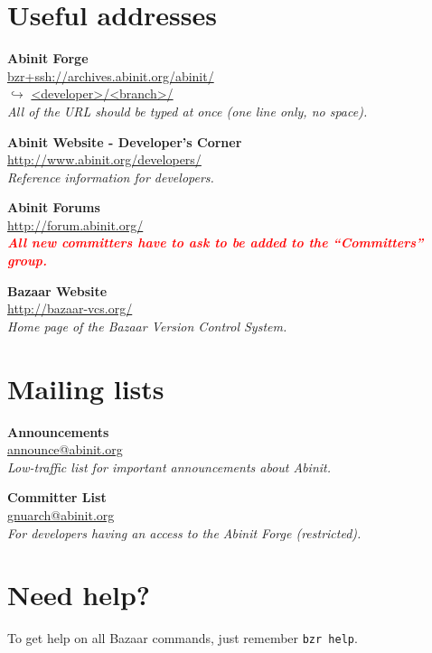 \documentclass[tumble,foldmark,a4paper]{leaflet}
\begin{document}
\newpage

\section*{Useful addresses}

\begin{center}
\textbf{Abinit Forge} \\
\url{bzr+ssh://archives.abinit.org/abinit/} \\
$\hookrightarrow$ \url{<developer>/<branch>/} \\
\textit{All of the URL should be typed at once (one line only, no space).}
\end{center}

\begin{center}
\textbf{Abinit Website - Developer's Corner} \\
\url{http://www.abinit.org/developers/} \\
\textit{Reference information for developers.}
\end{center}

\begin{center}
\textbf{Abinit Forums} \\
\url{http://forum.abinit.org/} \\
\textit{\textbf{\textcolor{red}{All new committers have to ask to be
added to the ``Committers'' group.}}}
\end{center}

\begin{center}
\textbf{Bazaar Website} \\
\url{http://bazaar-vcs.org/} \\
\textit{Home page of the Bazaar Version Control System.}
\end{center}

\section*{Mailing lists}

\begin{center}
\textbf{Announcements} \\
\url{announce@abinit.org} \\
\textit{Low-traffic list for important announcements about Abinit.}
\end{center}

\begin{center}
\textbf{Committer List} \\
\url{gnuarch@abinit.org} \\
\textit{For developers having an access to the Abinit Forge (restricted).}
\end{center}

\section*{Need help?}

To get help on all Bazaar commands, just remember \texttt{bzr~help}.
\end{document}
